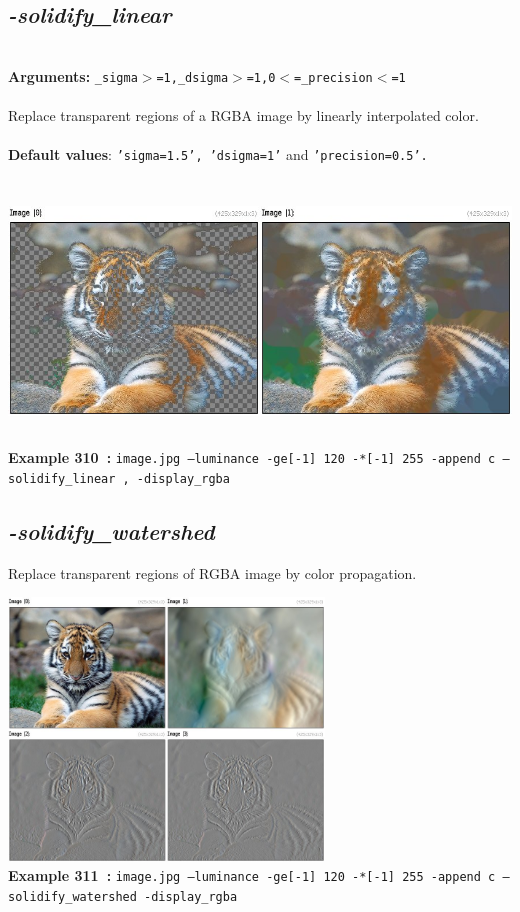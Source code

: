 \documentclass[a4paper,11pt,twoside]{book}
\begin{document}
\subsection{\emph{-solidify\_linear} }\vspace*{-0.5em}
~\\\textbf{Arguments: } 
{\small \texttt{\_sigma$>$=1,\_dsigma$>$=1,0$<$=\_precision$<$=1}}\\~\\
Replace transparent regions of a RGBA image by linearly interpolated color.
~\\~\\\textbf{Default values}: {\small \texttt{'sigma=1.5', 'dsigma=1'} and \texttt{'precision=0.5'.}}
\begin{center}\includegraphics[keepaspectratio=true,height=7cm,width=\textwidth]{img/gmic_def310.jpg}\\
{\footnotesize \textbf{Example 310~:} \texttt{image.jpg --luminance -ge[-1] 120 -*[-1] 255 -append c --solidify\_linear , -display\_rgba}}
\end{center}

\subsection{\emph{-solidify\_watershed} }\vspace*{-0.5em}
Replace transparent regions of RGBA image by color propagation.
\begin{center}\includegraphics[keepaspectratio=true,height=7cm,width=\textwidth]{img/gmic_def311.jpg}\\
{\footnotesize \textbf{Example 311~:} \texttt{image.jpg --luminance -ge[-1] 120 -*[-1] 255 -append c --solidify\_watershed -display\_rgba}}
\end{center}
\end{document}
